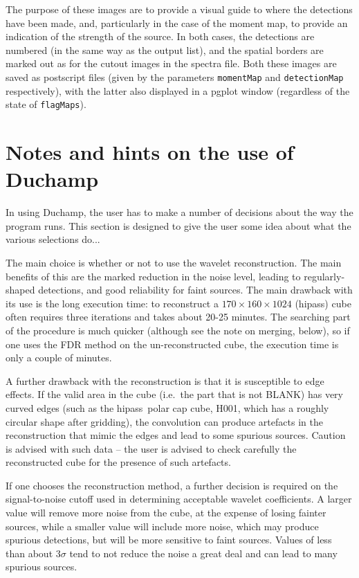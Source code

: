\documentclass[12pt,a4paper]{article}
\newcommand{\ie}{i.e.\ }
\newcommand{\hipass}{{\sc hipass}}
\begin{document}
The purpose of these images are to provide a visual guide to where the
detections have been made, and, particularly in the case of the moment
map, to provide an indication of the strength of the source. In both
cases, the detections are numbered (in the same way as the output
list), and the spatial borders are marked out as for the cutout images
in the spectra file. Both these images are saved as postscript files
(given by the parameters {\tt momentMap} and {\tt detectionMap}
respectively), with the latter also displayed in a {\sc pgplot}
window (regardless of the state of {\tt flagMaps}).

\section{Notes and hints on the use of Duchamp}

In using Duchamp, the user has to make a number of decisions about
the way the program runs. This section is designed to give the user
some idea about what the various selections do...

The main choice is whether or not to use the wavelet
reconstruction. The main benefits of this are the marked reduction in
the noise level, leading to regularly-shaped detections, and good
reliability for faint sources. The main drawback with its use is the
long execution time: to reconstruct a $170\times160\times1024$
(\hipass) cube often requires three iterations and takes about 20-25
minutes. The searching part of the procedure is much quicker (although
see the note on merging, below), so if one uses the FDR method on the
un-reconstructed cube, the execution time is only a couple of minutes.

A further drawback with the reconstruction is that it is susceptible
to edge effects. If the valid area in the cube (\ie the part that is
not BLANK) has very curved edges (such as the \hipass\ polar cap cube,
H001, which has a roughly circular shape after gridding), the
convolution can produce artefacts in the reconstruction that mimic
the edges and lead to some spurious sources. Caution is advised with
such data -- the user is advised to check carefully the reconstructed
cube for the presence of such artefacts.

If one chooses the reconstruction method, a further decision is
required on the signal-to-noise cutoff used in determining acceptable
wavelet coefficients. A larger value will remove more noise from the
cube, at the expense of losing fainter sources, while a smaller value
will include more noise, which may produce spurious detections, but
will be more sensitive to faint sources. Values of less than about
$3\sigma$ tend to not reduce the noise a great deal and can lead to
many spurious sources.
\end{document}
